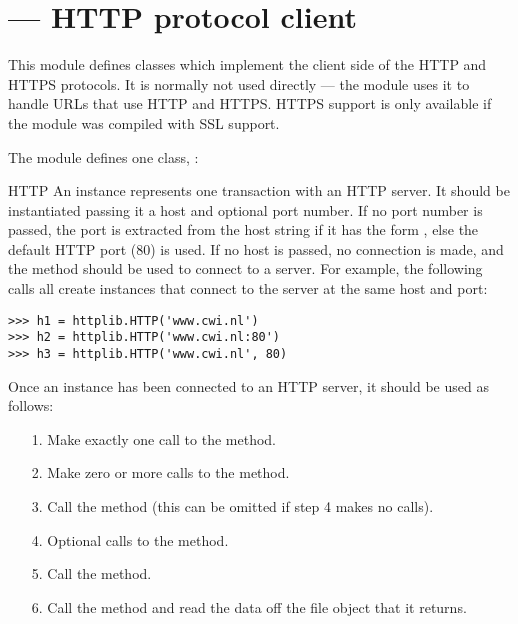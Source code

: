 \section{ ---
         HTTP protocol client}



This module defines classes which implement the client side of the
HTTP and HTTPS protocols.  It is normally not used directly --- the
module  uses it to handle URLs
that use HTTP and HTTPS.    HTTPS support is only
available if the  module was compiled with SSL
support.

The module defines one class, :

\begin{classdesc}{HTTP}{}
An  instance
represents one transaction with an HTTP server.  It should be
instantiated passing it a host and optional port number.  If no port
number is passed, the port is extracted from the host string if it has
the form , else the default HTTP port (80)
is used.  If no host is passed, no connection is made, and the
 method should be used to connect to a server.  For
example, the following calls all create instances that connect to the
server at the same host and port:

\begin{verbatim}
>>> h1 = httplib.HTTP('www.cwi.nl')
>>> h2 = httplib.HTTP('www.cwi.nl:80')
>>> h3 = httplib.HTTP('www.cwi.nl', 80)
\end{verbatim}

Once an  instance has been connected to an HTTP server, it
should be used as follows:

\begin{enumerate}

\item[1.] Make exactly one call to the  method.

\item[2.] Make zero or more calls to the  method.

\item[3.] Call the  method (this can be omitted if
step 4 makes no calls).

\item[4.] Optional calls to the  method.

\item[5.] Call the  method.

\item[6.] Call the  method and read the data off the
file object that it returns.

\end{enumerate}
\end{classdesc}

